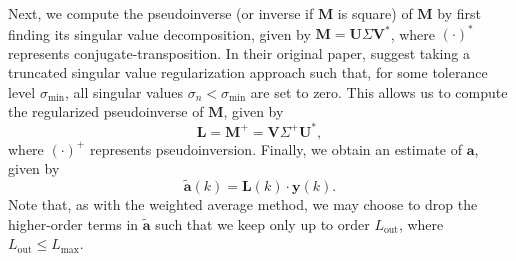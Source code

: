 Next, we compute the pseudoinverse (or inverse if $\mathbf{M}$ is square) of $\mathbf{M}$ by first finding its singular value decomposition, given by $\mathbf{M} = \mathbf{U} \Sigma \mathbf{V}^*$, where $(\cdot)^*$ represents conjugate-transposition.
In their original paper, \citet{Samarasinghe2014a} suggest taking a truncated singular value regularization approach such that, for some tolerance level $\sigma_\text{min}$, all singular values $\sigma_n < \sigma_\text{min}$ are set to zero.
This allows us to compute the regularized pseudoinverse of $\mathbf{M}$, given by \citep[Eq.~(17)]{Samarasinghe2014a}
\begin{equation}
\mathbf{L} = \mathbf{M}^{+} = \mathbf{V} \Sigma^{+} \mathbf{U}^*,
\end{equation}
where $(\cdot)^+$ represents pseudoinversion.
Finally, we obtain an estimate of $\mathbf{a}$, given by
\begin{equation}
\mathbf{\tilde{a}}(k) = \mathbf{L}(k) \cdot \mathbf{y}(k).
\end{equation}
Note that, as with the weighted average method, we may choose to drop the higher-order terms in $\mathbf{\tilde{a}}$ such that we keep only up to order $L_\textrm{out}$, where $L_\textrm{out} \leq L_\textrm{max}$.